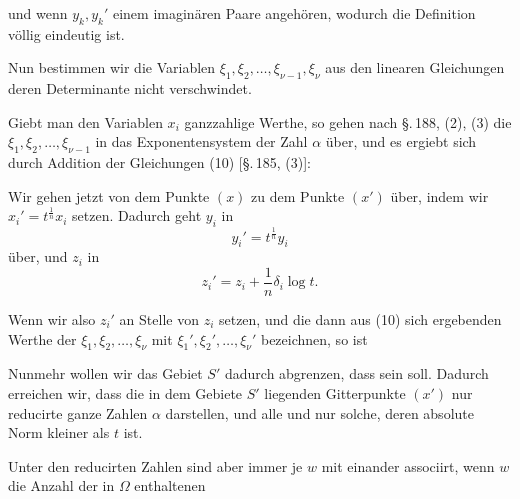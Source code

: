 und wenn $y_k, y_k'$ einem imaginären Paare angehören,
wodurch die Definition völlig eindeutig ist.

Nun bestimmen wir die Variablen $\xi_1, \xi_2, \ldots, \xi_{\nu-1}, \xi_\nu$ aus den linearen Gleichungen
deren Determinante nicht verschwindet.

Giebt man den Variablen $x_i$ ganzzahlige Werthe, so gehen nach \S.\,188, (2), (3) die $\xi_1, \xi_2, \ldots, \xi_{\nu-1}$ in das Exponentensystem der Zahl $\alpha$ über, und es ergiebt sich durch Addition der Gleichungen (10) [\S.\,185, (3)]:

Wir gehen jetzt von dem Punkte $(x)$ zu dem Punkte $(x')$ über, indem wir $x_i' = t^{\frac{1}{n}} x_i$ setzen. Dadurch geht $y_i$ in
\[ y_i' = t^{\frac{1}{n}} y_i \]
über, und $z_i$ in
\[ z_i' = z_i + \frac{1}{n} \delta_i \log t. \]

Wenn wir also $z_i'$ an Stelle von $z_i$ setzen, und die dann aus (10) sich ergebenden Werthe der $\xi_1, \xi_2, \ldots, \xi_\nu$ mit $\xi_1', \xi_2', \ldots, \xi_\nu'$ bezeichnen, so ist

Nunmehr wollen wir das Gebiet $S'$ dadurch abgrenzen, dass
sein soll. Dadurch erreichen wir, dass die in dem Gebiete $S'$ liegenden Gitterpunkte $(x')$ nur reducirte ganze Zahlen $\alpha$ darstellen, und alle und nur solche, deren absolute Norm kleiner als $t$ ist.

Unter den reducirten Zahlen sind aber immer je $w$ mit einander associirt, wenn $w$ die Anzahl der in $\Omega$ enthaltenen
